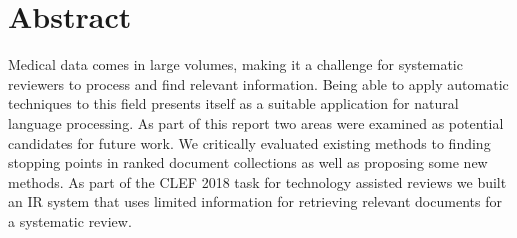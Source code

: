 \chapter*{\Large \center Abstract}

Medical data comes in large volumes, making it a challenge for systematic reviewers to process and find relevant information. Being able to apply automatic techniques to this field presents itself as a suitable application for natural language processing. As part of this report two areas were examined as potential candidates for future work. We critically evaluated existing methods to finding stopping points in ranked document collections as well as proposing some new methods. As part of the CLEF 2018 task for technology assisted reviews we built an IR system that uses limited information for retrieving relevant documents for a systematic review.
 
